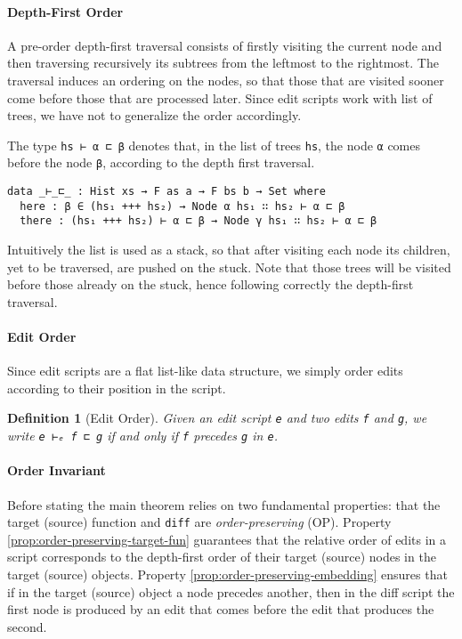 \documentclass[preprint]{sigplanconf}
\theoremstyle{plain}
\newtheorem{definition}{Definition}
\begin{document}
    \paragraph{Depth-First Order}
    A pre-order depth-first traversal consists of firstly visiting the current node 
    and then traversing recursively its subtrees from the leftmost to the rightmost.
    The traversal induces an ordering on the nodes, so that those that
    are visited sooner come before those that are processed later.
    Since edit scripts work with list of trees, we have not to generalize the order accordingly.
    
    The type \texttt{hs ⊢ α ⊏ β} denotes that, in the list of trees \texttt{hs}, 
    the node \texttt{α} comes before the node \texttt{β}, according to the
    depth first traversal.

\begin{verbatim}
data _⊢_⊏_ : Hist xs → F as a → F bs b → Set where
  here : β ∈ (hs₁ +++ hs₂) → Node α hs₁ ∷ hs₂ ⊢ α ⊏ β
  there : (hs₁ +++ hs₂) ⊢ α ⊏ β → Node γ hs₁ ∷ hs₂ ⊢ α ⊏ β
\end{verbatim}

    Intuitively the list is used as a stack, so that after visiting
    each node its children, yet to be traversed, are pushed on the stuck.
    Note that those trees will be visited before those already on the stuck,
    hence following correctly the depth-first traversal.

    \paragraph{Edit Order}
    Since edit scripts are a flat list-like data structure, we simply
    order edits according to their position in the script.

\begin{definition}[Edit Order]
Given an edit script \texttt{e} and two edits \texttt{f} and \texttt{g}, we write
\texttt{e ⊢ₑ f ⊏ g} if and only if \texttt{f} precedes \texttt{g} in \texttt{e}.
\end{definition}

\paragraph{Order Invariant}
Before stating the main theorem relies on two fundamental properties:
that the target (source) function and \texttt{diff} are
\emph{order-preserving} (OP).
%
Property \ref{prop:order-preserving-target-fun} guarantees that the
relative order of edits in a script corresponds to the depth-first
order of their target (source) nodes in the target (source) objects.
%
Property \ref{prop:order-preserving-embedding} ensures that if in the
target (source) object a node precedes another, then in the diff
script the first node is produced by an edit that comes before the
edit that produces the second.
\end{document}
